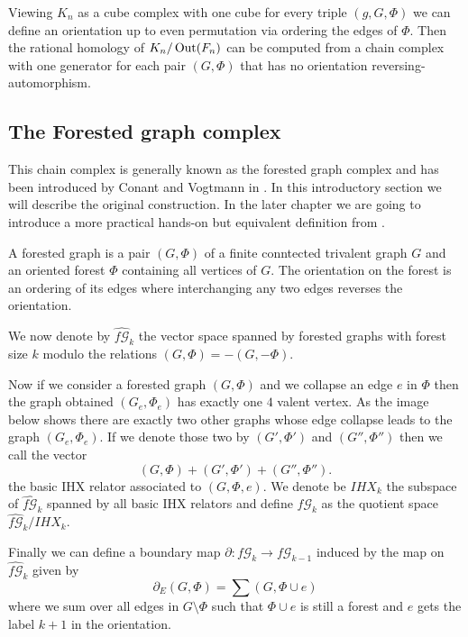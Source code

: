 Viewing $K_{n}$ as a cube complex with one cube for every triple $(g,G,\Phi)$ we can define an orientation up to even permutation
via ordering the edges of $\Phi$. Then the rational homology of $K_{n} / \operatorname{Out}(F_{n})$ can be
computed from a chain complex with one generator for each pair $(G,\Phi)$ that has no orientation
reversing-automorphism.

\subsection{The Forested graph complex}
This chain complex is generally known as the forested graph complex and has been
introduced by Conant and Vogtmann in \cite{conant03}. In this introductory section
we will describe the original construction. In the later chapter we are going to
introduce a more practical hands-on but equivalent definition from \cite{conant08}.

\begin{definition}
	A forested graph is a pair $(G,\Phi)$ of a finite conntected trivalent graph $G$ and an oriented forest $\Phi$ containing all vertices of $G$.
	The orientation on the forest is an ordering of its edges where interchanging any two edges reverses the orientation.
\end{definition}

We now denote by $\widehat{f\mathcal{G}}_{k}$ the vector space spanned by forested graphs with forest size $k$ modulo the relations
$(G,\Phi) = -(G,-\Phi)$.

Now if we consider a forested graph $(G,\Phi)$ and we collapse an edge $e$ in $\Phi$ then the graph obtained $(G_{e},\Phi_{e})$ 
has exactly one $4$ valent vertex. As the image below shows there are exactly two other graphs
whose edge collapse leads to the graph $(G_{e},\Phi_{e})$.
If we denote those two by $(G',\Phi')$ and  $(G'',\Phi'')$ then we call the vector
\[
	(G,\Phi) + (G',\Phi') + (G'',\Phi'')
.\] 
the basic IHX relator associated to $(G,\Phi,e)$. 
We denote be $IHX_{k}$ the subspace of $\widehat{f\mathcal{G}}_{k}$ spanned by all basic IHX relators
and define $f\mathcal{G}_{k}$ as the quotient space $\widehat{f\mathcal{G}}_{k} / IHX_{k}$.

Finally we can define a boundary map  $\partial: f\mathcal{G}_{k} \to f\mathcal{G}_{k-1}$ induced by the map on $\widehat{f \mathcal{G}}_{k}$ given by
\[
	\partial_{E}(G,\Phi) = \sum (G,\Phi \cup e)
\] 
where we sum over all edges in $G \setminus \Phi$ such that $\Phi \cup e$ is still a forest and 
$e$ gets the label $k+1$ in the orientation.

